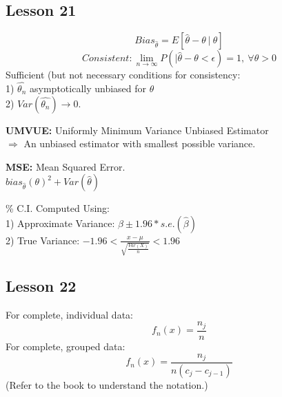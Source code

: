 \documentclass[11pt,twocolumn]{article}
\def\wl{\par \vspace{\baselineskip}}
\def\imply{\Rightarrow}
\begin{document}
\subsection*{Lesson 21}
  \[ Bias_{\hat{\theta}} = E[\hat{\theta} - \theta~|~\theta] \]
  \[ Consistent: \lim_{n \to \infty} P(|\hat{\theta}-\theta < \epsilon) = 1, 
                 ~\forall \theta > 0 \]
  Sufficient (but not necessary conditions for consistency: \\
  1) $\hat{\theta_n}$ asymptotically unbiased for $\theta$ \\
  2) $Var(\hat{\theta_n}) \to 0$.

  \newpage\noindent
  \textbf{UMVUE:} Uniformly Minimum Variance Unbiased Estimator\\
  $\imply$ An unbiased estimator with smallest possible variance.
  \wl\noindent
  \textbf{MSE:} Mean Squared Error. \\
  $bias_{\hat{\theta}}(\theta)^2 + Var(\hat{\theta})$
  \wl{}\% C.I. Computed Using:\\
  1) Approximate Variance: $\hat{\beta} \pm 1.96*s.e.(\hat{\beta}) $\\
  2) True Variance: $-1.96 < \frac{x-\mu}{\sqrt{\frac{Var(X)}{n}}}< 1.96$\\
  
\subsection*{Lesson 22}
  For complete, individual data:
  \[ f_n(x) = \frac{n_j}{n}\]
  For complete, grouped data:
  \[ f_n(x) = \frac{n_j}{n(c_j-c_{j-1})}\]
  (Refer to the book to understand the notation.)
\end{document}
